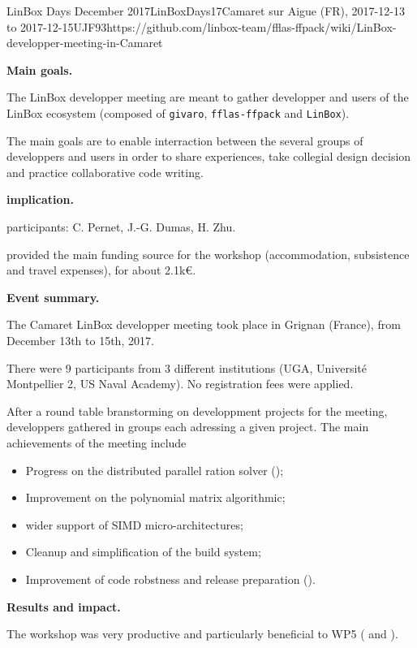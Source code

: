 \begin{event}{LinBox Days December 2017}{LinBoxDays17}{Camaret sur Aigue (FR),
2017-12-13 to 2017-12-15}{UJF}{9}{3}{https://github.com/linbox-team/fflas-ffpack/wiki/LinBox-developper-meeting-in-Camaret}

\textbf{Main goals.}

The LinBox developper meeting are meant to gather developper and users of the
LinBox ecosystem (composed of \texttt{givaro}, \texttt{fflas-ffpack} and
\texttt{LinBox}).

The main goals are to enable interraction between the several groups of
developpers and users in order to share experiences, take collegial design
decision and practice collaborative code writing.

\textbf{\ODK implication.}

\ODK participants: C. Pernet, J.-G. Dumas, H. Zhu.

\ODK provided the main funding source for the workshop (accommodation,
subsistence and travel expenses), for about 2.1k\euro.

\textbf{Event summary.}

The Camaret LinBox developper meeting took place in Grignan (France), from December
13th to 15th, 2017.

There were 9 participants from 3 different institutions (UGA, Université
Montpellier 2, US Naval Academy).
No registration fees were applied.

After a round table branstorming on developpment projects for the meeting,
developpers gathered in groups each adressing a given project.
The main achievements of the meeting include
\begin{itemize}
\item Progress on the distributed parallel ration solver ();
\item Improvement on the polynomial matrix algorithmic;
\item wider support of SIMD micro-architectures;
\item Cleanup and simplification of the build system;
\item Improvement of code robstness and release preparation ().
\end{itemize}


\textbf{Results and impact.}

The workshop was very productive and particularly beneficial to WP5
( and ).
\end{event}
